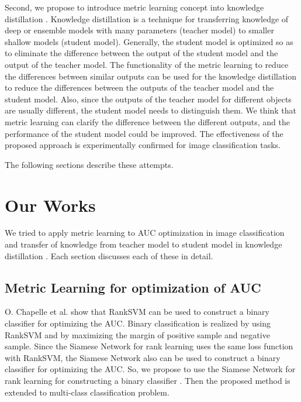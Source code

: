 \documentclass[twocolumn,10pt]{article}
\begin{document}
Second, we propose to introduce metric learning concept  into  knowledge  distillation \cite{Oki2020}.
Knowledge distillation is a technique for transferring knowledge of deep or ensemble models with many parameters (teacher model) to smaller shallow models (student model).
Generally, the student model is optimized so as to eliminate the difference between the output of the student model and the output of the teacher model.
The  functionality  of  the metric  learning  to  reduce  the  differences  between  similar outputs  can  be  used  for  the  knowledge  distillation  to  reduce the differences between the outputs of the teacher model and the  student  model.  
Also, since  the  outputs  of  the  teacher  model for  different  objects  are  usually  different,  the  student  model needs  to  distinguish  them.  
We  think  that  metric  learning  can clarify  the  difference  between  the  different  outputs,  and  the performance of the student model could be improved.
The effectiveness of the proposed approach is experimentally confirmed for image classification tasks.

The following sections describe these attempts.
\thispagestyle{empty}
\section{Our Works}
We tried to apply metric learning to AUC optimization in image classification \cite{Oki2019} and transfer of knowledge from teacher model to student model in knowledge distillation \cite{Oki2020}.
Each section discusses each of these in detail.
\subsection{Metric Learning for optimization of AUC}
O. Chapelle et al. \cite{Chapelle2010} show that RankSVM can be used to construct a binary classifier for optimizing the AUC.
Binary classification is realized by using RankSVM and by maximizing the margin of positive sample and negative sample. 
Since the Siamese Network for rank learning uses the same loss function with RankSVM,
the Siamese Network also can be used to construct a binary classifier for optimizing the AUC.
So, we propose to use the Siamese Network for rank learning for constructing a binary classifier \cite{Oki2019}.
Then the proposed method is extended to multi-class classification problem.
\end{document}

